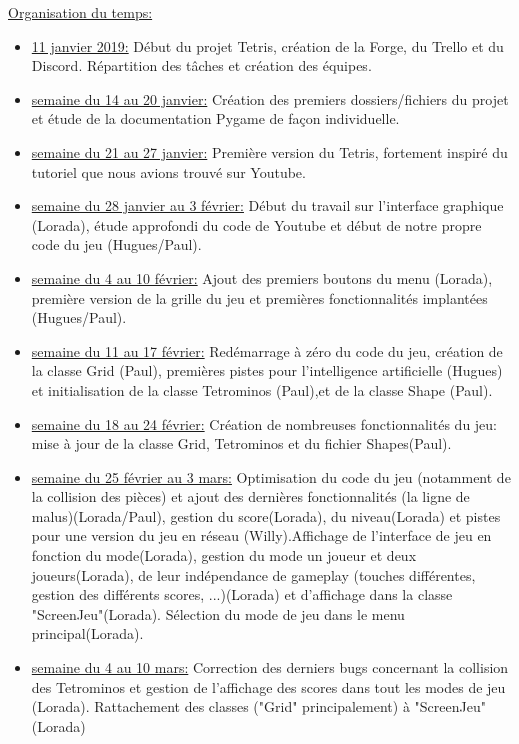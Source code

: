 \documentclass[a4paper, 11pt]{article}
\begin{document}
            \underline{Organisation du temps:}
            \begin{itemize}
            	\item \underline{11 janvier 2019:} Début du projet Tetris, création de la Forge, du Trello et du Discord. Répartition des tâches et création des équipes.
            	\item \underline{semaine du 14 au 20 janvier:} Création des premiers dossiers/fichiers du projet et étude de la documentation Pygame de façon individuelle.
            	\item \underline{semaine du 21 au 27 janvier:} Première version du Tetris, fortement inspiré du tutoriel que nous avions trouvé sur Youtube. 
            	\item \underline{semaine du 28 janvier au 3 février:} Début du travail sur l'interface graphique (Lorada), étude approfondi du code de Youtube et début de notre propre code du jeu (Hugues/Paul).
            	\item \underline{semaine du 4 au 10 février:} Ajout des premiers boutons du menu (Lorada), première version de la grille du jeu et premières fonctionnalités implantées (Hugues/Paul).
            	\item \underline{semaine du 11 au 17 février:} Redémarrage à zéro du code du jeu, création de la classe Grid (Paul), premières pistes pour l'intelligence artificielle (Hugues) et initialisation de la classe Tetrominos (Paul),et de la classe Shape (Paul).
            	\item \underline{semaine du 18 au 24 février:} Création de nombreuses fonctionnalités du jeu: mise à jour de la classe Grid, Tetrominos et du fichier Shapes(Paul).
            	\item \underline{semaine du 25 février au 3 mars:} Optimisation du code du jeu (notamment de la collision des pièces) et ajout des dernières fonctionnalités (la ligne de malus)(Lorada/Paul), gestion du score(Lorada), du niveau(Lorada) et pistes pour une version du jeu en réseau (Willy).Affichage de l'interface de jeu en fonction du mode(Lorada), gestion du mode un joueur et deux joueurs(Lorada), de leur indépendance de gameplay (touches différentes, gestion des différents scores, ...)(Lorada) et d'affichage dans la classe "ScreenJeu"(Lorada). Sélection du mode de jeu dans le menu principal(Lorada).
            	\item \underline{semaine du 4 au 10 mars:} Correction des derniers bugs concernant la collision des Tetrominos et gestion de 	l'affichage des scores dans tout les modes de jeu (Lorada). Rattachement des classes ("Grid" principalement) à "ScreenJeu" (Lorada)

\end{itemize}
\end{document}
